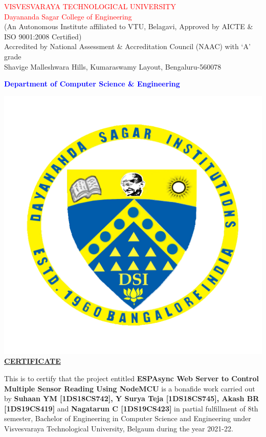 \documentclass[12pt,a4paper,twocolumn,fleqn]{article}
\begin{document}
\begin{center}
\textcolor{red}{\LARGE{VISVESVARAYA TECHNOLOGICAL UNIVERSITY}} \\
\textcolor{red}{\LARGE{Dayananda Sagar College of Engineering}} \\
\footnotesize{(An Autonomous Institute affiliated to VTU, Belagavi, Approved by AICTE \& ISO 9001:2008 Certified)} \\
\footnotesize{Accredited by National Assessment \& Accreditation Council (NAAC) with ‘A’ grade}  \\
\footnotesize{Shavige Malleshwara Hills, Kumaraswamy Layout, Bengaluru-560078} \\
\begin{flushleft}
\textcolor{blue}{\LARGE{\textbf{Department of Computer Science \& Engineering}}} \\
\end{flushleft}
\includegraphics[scale=0.4]{media/DSCE-min.png} \\
\Large{\underline{\textbf{CERTIFICATE}}} \\
  \end{center}
\normalsize
This is to certify that the project entitled \textbf{ESPAsync Web Server to Control Multiple Sensor Reading Using NodeMCU} is a bonafide work carried out by \textbf{Suhaan YM [1DS18CS742], Y Surya Teja [1DS18CS745], Akash BR [1DS19CS419]} and \textbf{Nagatarun C [1DS19CS423]} in partial fulfillment of 8th semester, Bachelor of Engineering in Computer Science and Engineering under Visvesvaraya Technological University, Belgaum during the year 2021-22. \\
\end{document}

